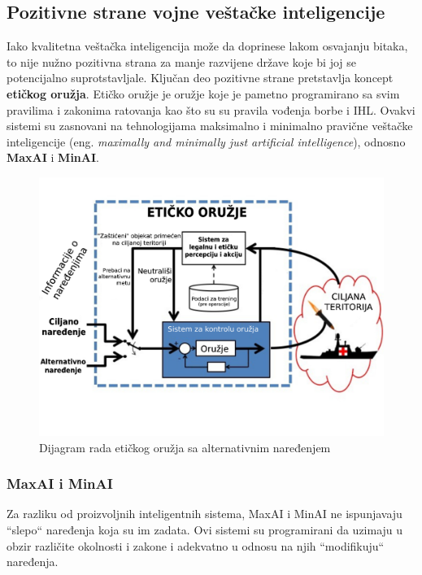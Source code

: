 \documentclass[a4paper]{article}
\begin{document}
\subsection{Pozitivne strane vojne veštačke inteligencije}
\label{subsec: Pozitivne strane vojne veštačke inteligencije}
Iako kvalitetna veštačka inteligencija može da doprinese lakom osvajanju bitaka, to nije nužno pozitivna strana za manje razvijene države koje bi joj se potencijalno suprotstavljale. Ključan deo pozitivne strane pretstavlja koncept \textbf{etičkog oružja}. Etičko oružje je oružje koje je pametno programirano sa svim pravilima i zakonima ratovanja kao što su su pravila vođenja borbe i IHL. Ovakvi sistemi su zasnovani na tehnologijama maksimalno i minimalno pravične veštačke inteligencije (eng. \textit{maximally and minimally just artificial intelligence}), odnosno \textbf{MaxAI} i \textbf{MinAI}.

\begin{figure}[h!]
\begin{center}
\includegraphics[scale=0.18]{minAi_new.jpg}
\end{center}
\caption{Dijagram rada etičkog oružja sa alternativnim naređenjem} 
\label{fig:minAI}
\end{figure} 

\subsubsection{MaxAI i MinAI}
\label{subsubsec: MaxAI i MinAI}
Za razliku od proizvoljnih inteligentnih sistema, MaxAI i MinAI ne ispunjavaju ``slepo`` naređenja koja su im zadata. Ovi sistemi su programirani da uzimaju u obzir različite okolnosti i zakone i adekvatno u odnosu na njih ``modifikuju`` naređenja.
\end{document}
